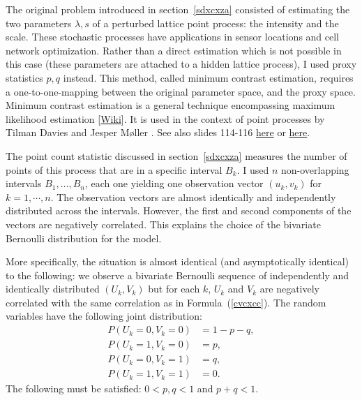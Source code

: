 \documentclass[oneside,10pt]{book}
\begin{document}
The original problem introduced in section~\ref{sdxcxza} consisted of estimating the two parameters
 $\lambda, s$ of a perturbed lattice point process: the intensity and the scale. These stochastic processes have applications in sensor locations and cell network optimization. Rather than a direct estimation which is not possible in this case (these parameters are attached to a hidden lattice process), I used proxy statistics $p, q$ instead. This method, called
\textcolor{index}{minimum contrast estimation}, requires a one-to-one-mapping between the original parameter space, and the proxy space. Minimum contrast estimation is a general technique encompassing
 \textcolor{index}{maximum likelihood estimation} [\href{https://en.wikipedia.org/wiki/Maximum_likelihood_estimation}{Wiki}]. It is used in the context
 of point processes by Tilman Davies \cite{hghf}
 and Jesper Møller \cite{momo55}. See also slides 114-116 \href{https://cimpatogo2018.sciencesconf.org/data/pages/Handout_Moller_CIMPA_Togo_2018.pdf}{here} or
\href{https://drive.google.com/file/d/1y5TZXvAL8fP9G5UkmV3npKgoVB0YWtXk/view?usp=sharing}{here}.



The point count statistic discussed in section~\ref{sdxcxza} measures the number of points of this process that are in a specific interval $B_k$. I used $n$ non-overlapping intervals $B_1,\dots, B_n$, each one yielding one observation vector $(u_k,v_k)$ for $k=1,\cdots,n$. The observation vectors are almost identically and independently distributed across the intervals. However, the first and second components of the vectors are negatively correlated. This explains the choice of the bivariate Bernoulli distribution for the model.



More specifically, the situation is almost identical (and asymptotically identical) to the following: we observe a bivariate Bernoulli sequence of independently and identically distributed $(U_k, V_k)$ but for each $k$, $U_k$ and $V_k$ are negatively correlated with
the same correlation as in Formula~(\ref{cvcxcc}). The random variables have the following joint distribution:
\begin{align}
 P(U_k=0,V_k=0) & =1-p-q,\nonumber \\
 P(U_k=1,V_k=0) & =p,\nonumber \\
 P(U_k=0,V_k=1) & =q, \nonumber \\
 P(U_k=1,V_k=1) & =0.\nonumber
\end{align}
The following must be satisfied: $0<p,q<1$ and $p+q<1$.
\end{document}
